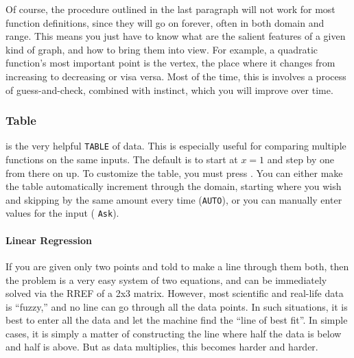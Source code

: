 Of course, the procedure outlined in the last paragraph will not work for most function definitions,
since they will go on forever, often in both domain and range.  This means you just have to know
what are the salient features of a given kind of graph, and how to bring them into view.  For example,
a quadratic function's most important point is the vertex, the place where it changes from increasing
to decreasing or visa versa.  Most of the time, this is involves a process of guess-and-check,
combined with instinct, which you will improve over time.

\subsubsection{Table}
\Touche[style=second] \Touche[style=graph,principal={graph},position=0.9,fontsize=7pt,raise=-5pt] is
the very helpful \texttt{TABLE} of data.  This is especially useful for comparing multiple functions on 
the same inputs.  The default is to start at $x=1$ and step by one from there on up.
To customize the table, you must press \Touche[style=second] 
\Touche[style=graph,principal=window,position=0.9,fontsize=7pt,second=tblset,raise=-10pt].  
You can either make the table 
automatically increment through the domain, starting where you wish and skipping by the
same amount every time (\texttt{AUTO}), or you can manually enter values for the input (
\texttt{Ask}).


\paragraph{Linear Regression}
If you are given only two points and told to make a line through them both, then the problem is 
a very easy system of two equations, and can be immediately solved via the RREF of a 2x3 matrix.
However, most scientific and real-life data is ``fuzzy,'' and no line can go through all the data points.
In such situations, it is best to enter all the data and let the machine find the ``line of best fit''.  In 
simple cases, it is simply a matter of constructing the line where half the data is below and half is 
above.  But as data multiplies, this becomes harder and harder.

